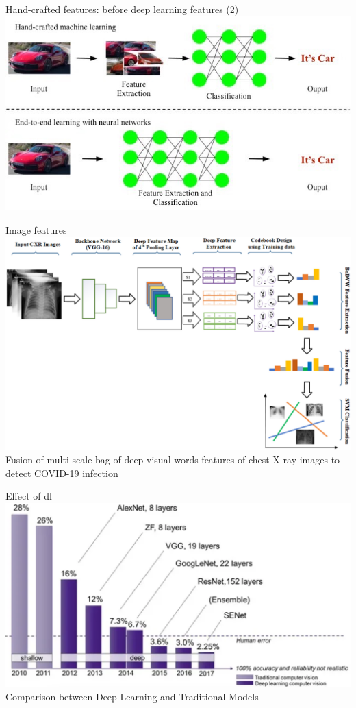 \documentclass[default, aspectratio=169]{beamer}
\begin{document}
	\begin{frame}{Hand-crafted features: before deep learning features (2)}
		\centering
		\includegraphics[keepaspectratio, scale=0.5]{pic/do-machine-learning-neural-networks-tasks-using-python copy 3.jpg}
	\end{frame}
	\begin{frame}{Image features}
		\centering
		\includegraphics[keepaspectratio, scale=0.23]{pic/image_features.png}\\ \small{Fusion of multi-scale bag of deep visual words features of chest X-ray images to detect COVID-19 infection}
	\end{frame}
	\begin{frame}{Effect of dl}
		\centering
		\includegraphics[keepaspectratio, scale=0.35]{pic/Synopsys_computer-vision-processors.png}\\\small{Comparison between Deep Learning and Traditional Models}
	\end{frame}
	
\end{document}
